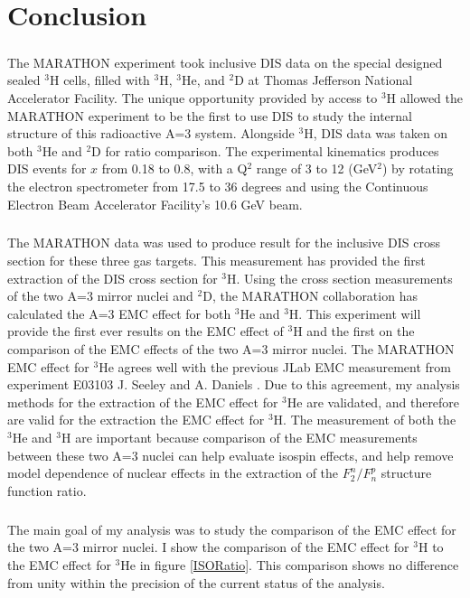 
\chapter{Conclusion}
\paragraph{}The MARATHON experiment took inclusive DIS data on the special designed sealed $^3$H cells, filled with $^3$H, $^3$He, and $^2$D at Thomas Jefferson National Accelerator Facility. The unique opportunity provided by access to $^3$H allowed the MARATHON experiment to be the first to use DIS to study the internal structure of this radioactive A=3 system. Alongside $^3$H, DIS data was taken on both $^3$He and $^2$D for ratio comparison. The experimental kinematics produces DIS events for $x$ from 0.18 to 0.8, with a Q$^2$ range of 3 to 12 (GeV$^2$) by rotating the electron spectrometer from 17.5 to 36 degrees and using the Continuous Electron Beam Accelerator Facility's 10.6 GeV beam. 
\paragraph{}The MARATHON data was used to produce result for the inclusive DIS cross section for these three gas targets. This measurement has provided the first extraction of the DIS cross section for $^3$H. Using the cross section measurements of the two A=3 mirror nuclei and $^2$D, the MARATHON collaboration has calculated the A=3 EMC effect for both $^3$He and $^3$H. This experiment will provide the first ever results on the EMC effect of $^3$H and the first on the comparison of the EMC effects of the two A=3 mirror nuclei. The MARATHON EMC effect for $^3$He agrees well with the previous JLab EMC measurement from experiment E03103 J. Seeley and A. Daniels \cite{seeley}. Due to this agreement, my analysis methods for the extraction of the EMC effect for $^3$He are validated, and therefore are valid for the extraction the EMC effect for $^3$H. The measurement of both the $^3$He and $^3$H are important because comparison of the EMC measurements between these two A=3 nuclei can help evaluate isospin effects, and help remove model dependence of nuclear effects in the extraction of the $F^n_2/F^p_n$ structure function ratio. 

\paragraph{}The main goal of my analysis was to study the comparison of the EMC effect for the two A=3 mirror nuclei. I show the comparison of the EMC effect for $^3$H to the EMC effect for $^3$He in figure \ref{ISORatio}. This comparison shows no difference from unity within the precision of the current status of the analysis. 

